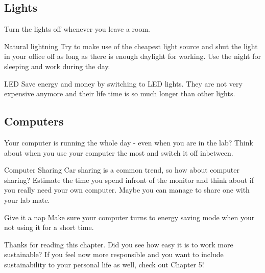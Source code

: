 
\subsection{Lights}
	Turn the lights off whenever you leave a room. 
	
\begin{suggest}{Natural lightning}
	Try to make use of the cheapest light source and shut the light in your office off as long as there is enough daylight for working. Use the night for sleeping and work during the day. 
\end{suggest} 

\begin{suggest}{LED}
		 Save energy and money by switching to LED lights. They are not very expensive anymore and their life time is so much longer than other lights.
\end{suggest}

\subsection{Computers}
	Your computer is running the whole day - even when you are in the lab? 
	Think about when you use your computer the most and switch it off inbetween.

\begin{suggest}{Computer Sharing}
	Car sharing is a common trend, so how about computer sharing? 
	Estimate the time you spend infront of the monitor and think about if you really need your own computer. Maybe you can manage to share one with your lab mate. 
\end{suggest}

\begin{suggest}{Give it a nap}
	Make sure your computer turns to energy saving mode when your not using it for a short time. 
\end{suggest}


Thanks for reading this chapter. Did you see how easy it is to work more sustainable? 
If you feel now more responsible and you want to include sustainability to your personal life as well, check out Chapter 5!  